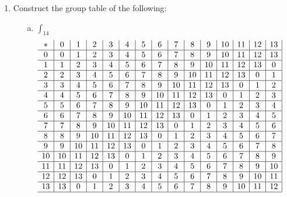 \begin{enumerate}
\begin{enumerate}
        \item Construct the group table of the following:
        \begin{enumerate}
            \item[a.] \(\int_{14}\)
                \begin{gather*}
                    \begin{array}{c|c|c|c|c|c|c|c|c|c|c|c|c|c|c|}
                        * & 0 & 1 & 2 & 3 & 4 & 5 & 6 & 7 & 8 & 9 & 10 & 11 & 12 & 13 \\ \hline
                        0 & 0 & 1 & 2 & 3 & 4 & 5 & 6 & 7 & 8 & 9 & 10 & 11 & 12 & 13 \\ \hline
                        1 & 1 & 2 & 3 & 4 & 5 & 6 & 7 & 8 & 9 & 10 & 11 & 12 & 13 & 0 \\ \hline
                        2 & 2 & 3 & 4 & 5 & 6 & 7 & 8 & 9 & 10 & 11 & 12 & 13 & 0 & 1 \\ \hline
                        3 & 3 & 4 & 5 & 6 & 7 & 8 & 9 & 10 & 11 & 12 & 13 & 0 & 1 & 2 \\ \hline
                        4 & 4 & 5 & 6 & 7 & 8 & 9 & 10 & 11 & 12 & 13 & 0 & 1 & 2 & 3 \\ \hline
                        5 & 5 & 6 & 7 & 8 & 9 & 10 & 11 & 12 & 13 & 0 & 1 & 2 & 3 & 4 \\ \hline
                        6 & 6 & 7 & 8 & 9 & 10 & 11 & 12 & 13 & 0 & 1 & 2 & 3 & 4 & 5 \\ \hline
                        7 & 7 & 8 & 9 & 10 & 11 & 12 & 13 & 0 & 1 & 2 & 3 & 4 & 5 & 6 \\ \hline
                        8 & 8 & 9 & 10 & 11 & 12 & 13 & 0 & 1 & 2 & 3 & 4 & 5 & 6 & 7 \\ \hline
                        9 & 9 & 10 & 11 & 12 & 13 & 0 & 1 & 2 & 3 & 4 & 5 & 6 & 7 & 8 \\ \hline
                        10 & 10 & 11 & 12 & 13 & 0 & 1 & 2 & 3 & 4 & 5 & 6 & 7 & 8 & 9 \\ \hline
                        11 & 11 & 12 & 13 & 0 & 1 & 2 & 3 & 4 & 5 & 6 & 7 & 8 & 9 & 10 \\ \hline
                        12 & 12 & 13 & 0 & 1 & 2 & 3 & 4 & 5 & 6 & 7 & 8 & 9 & 10 & 11 \\ \hline
                        13 & 13 & 0 & 1 & 2 & 3 & 4 & 5 & 6 & 7 & 8 & 9 & 10 & 11 & 12 \\ \hline
                    \end{array}
                \end{gather*}

\end{enumerate}
\end{enumerate}
\end{enumerate}
